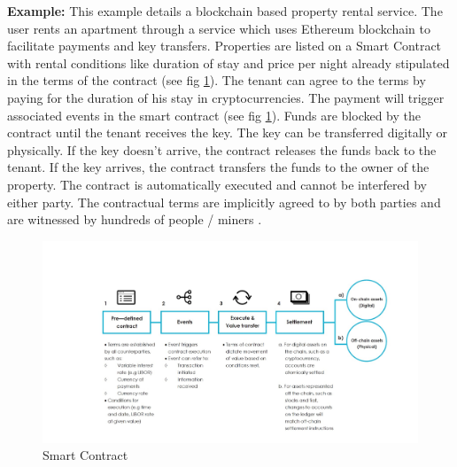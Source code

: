 \textbf{Example:}
This example details a blockchain based property rental service. The user rents an apartment through a service which uses Ethereum blockchain to facilitate payments and   key transfers. Properties are listed on a Smart Contract with rental conditions like duration of stay and price per night already stipulated in the terms of the contract (see fig \ref{fig:smartcontract}). The tenant can agree to the terms by paying for the duration of his stay in cryptocurrencies. The payment will trigger associated events in the smart contract (see fig \ref{fig:smartcontract}).  Funds are blocked by the contract until the tenant receives the key. The key can be transferred digitally or physically. If the key doesn’t arrive, the contract releases the funds back to the tenant. If the key arrives, the contract transfers the funds to the owner of the property. The contract is automatically executed and cannot be interfered by either party. The contractual terms are implicitly agreed to by both parties and are witnessed by hundreds of people / miners \cite{misc:024}.   

\begin{figure}[h]
	\centering
    \includegraphics[width=180mm,scale=0.5]{figs/smartcontract}
	\caption{Smart Contract \cite{paper:009}} 
	\label{fig:smartcontract}
\end{figure}
\clearpage
 
